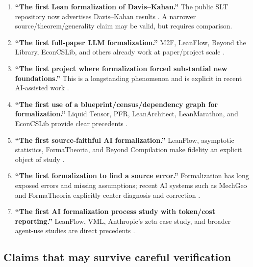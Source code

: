 \documentclass[11pt]{article}
\begin{document}
\begin{enumerate}
  \item \textbf{``The first Lean formalization of Davis--Kahan.''}
        The public SLT repository now advertises Davis--Kahan results
        \citep{zhang2026sltrepo}.  A narrower source/theorem/generality claim may
        be valid, but requires comparison.
  \item \textbf{``The first full-paper LLM formalization.''}
        M2F, LeanFlow, Beyond the Library, EconCSLib, and others already work at
        paper/project scale \citep{wang2026m2f,milikic2026leanflow,moakhar2026beyondlibrary,garg2026econcs}.
  \item \textbf{``The first project where formalization forced substantial new
        foundations.''}  This is a longstanding phenomenon and is explicit in
        recent AI-assisted work \citep{liquidblueprint2023,zhang2026slt,lu2026tensor}.
  \item \textbf{``The first use of a blueprint/census/dependency graph for
        formalization.''}  Liquid Tensor, PFR, LeanArchitect, LeanMarathon, and
        EconCSLib provide clear precedents
        \citep{liquidblueprint2023,pfrblueprint2024,zhu2026leanarchitect,zhang2026leanmarathon,garg2026econcs}.
  \item \textbf{``The first source-faithful AI formalization.''}
        LeanFlow, asymptotic statistics, FormaTheoria, and Beyond Compilation
        make fidelity an explicit object of study
        \citep{milikic2026leanflow,wei2026asymptotic,nie2026formatheoria,zhang2026beyondcompilation}.
  \item \textbf{``The first formalization to find a source error.''}
        Formalization has long exposed errors and missing assumptions; recent AI
        systems such as MechGeo and FormaTheoria explicitly center diagnosis and
        correction \citep{shen2026mechgeo,nie2026formatheoria}.
  \item \textbf{``The first AI formalization process study with token/cost
        reporting.''}  LeanFlow, VML, Anthropic's zeta case study, and broader
        agent-use studies are direct precedents
        \citep{milikic2026leanflow,ilin2026vml,anthropic2026zeta,mccain2026autonomy}.
\end{enumerate}

\subsection{Claims that may survive careful verification}
\end{document}
